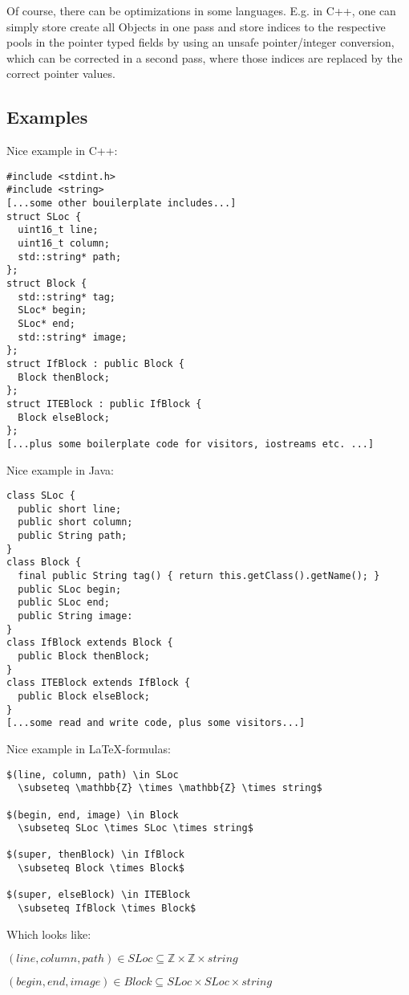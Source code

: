 \documentclass[a4paper,10pt]{article}
\begin{document}
Of course, there can be optimizations in some languages. E.g. in C++, one can simply store create all Objects in one pass and store indices to the respective pools in the pointer typed fields by using an unsafe pointer/integer conversion, which can be corrected in a second pass, where those indices are replaced by the correct pointer values.


\subsection{Examples}

Nice example in C++:
\begin{verbatim}
#include <stdint.h>
#include <string>
[...some other bouilerplate includes...]
struct SLoc {
  uint16_t line;
  uint16_t column;
  std::string* path;
};
struct Block {
  std::string* tag;
  SLoc* begin;
  SLoc* end;
  std::string* image;
};
struct IfBlock : public Block {
  Block thenBlock;
};
struct ITEBlock : public IfBlock {
  Block elseBlock;
};
[...plus some boilerplate code for visitors, iostreams etc. ...]
\end{verbatim}


Nice example in Java:
\begin{verbatim}
class SLoc {
  public short line;
  public short column;
  public String path;
}
class Block {
  final public String tag() { return this.getClass().getName(); }
  public SLoc begin;
  public SLoc end;
  public String image:
}
class IfBlock extends Block {
  public Block thenBlock;
}
class ITEBlock extends IfBlock {
  public Block elseBlock;
}
[...some read and write code, plus some visitors...]
\end{verbatim}


Nice example in \LaTeX-formulas:
\begin{verbatim}
$(line, column, path) \in SLoc
  \subseteq \mathbb{Z} \times \mathbb{Z} \times string$

$(begin, end, image) \in Block
  \subseteq SLoc \times SLoc \times string$

$(super, thenBlock) \in IfBlock
  \subseteq Block \times Block$

$(super, elseBlock) \in ITEBlock
  \subseteq IfBlock \times Block$
\end{verbatim}
Which looks like:

$(line, column, path) \in SLoc \subseteq \mathbb{Z} \times \mathbb{Z} \times string$

$(begin, end, image) \in Block \subseteq SLoc \times SLoc \times string$
\end{document}
